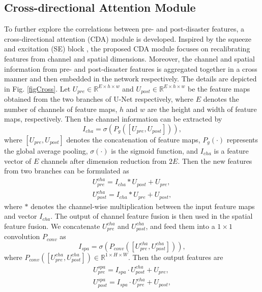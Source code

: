 \documentclass[journal]{IEEEtran}
\begin{document}
\subsection{Cross-directional Attention Module} 
To further explore the correlations between pre- and post-disaster features, a cross-directional attention (CDA) module is developed. Inspired by the squeeze and excitation (SE) block \cite{royRecalibratingFullyConvolutional2019}, the proposed CDA module focuses on recalibrating features from channel and spatial dimensions. 
Moreover, the channel and spatial information from  pre- and post-disaster features is aggregated together in a cross manner and then embedded in the network respectively. The details are depicted in Fig. \ref{figCross}. Let $U_{pre} \in\mathbb{R}^{E\times h\times w}$ and $U_{post}\in\mathbb{R}^{E\times h\times w}$ be the feature maps obtained from the two branches of U-Net respectively, where $E$ denotes the number of channels of feature maps, $h$ and $w$ are the height and width of feature maps, respectively. Then the channel information can be extracted by
\begin{equation}
I_{cha} = \sigma(P_g([U_{pre}, U_{post}])), 
\label{eqAverageP}
\end{equation}
where $[U_{pre}, U_{post}]$ denotes the concatenation of feature maps, $P_g(\cdot)$ represents the global average pooling,  $\sigma(\cdot)$ is the sigmoid function, and $I_{cha}$
is a feature vector of $E$ channels after dimension reduction from $2E$. Then the new features from two branches can be formulated as
\begin{equation}
\begin{aligned}
U_{pre}^{cha} = I_{cha}\ast U_{post} + U_{pre}, \\
U_{post}^{cha} = I_{cha}\ast U_{pre} + U_{post},
\end{aligned}
\label{eqChannel}
\end{equation}
where $\ast$ denotes the channel-wise multiplication between the input feature maps and vector $I_{cha}$. The output of channel feature fusion is then used in the spatial feature fusion. We concatenate $U_{pre}^{cha}$ and $U_{post}^{cha}$, and feed them into a $1\times1$ convolution $P_{conv}$ as
\begin{equation}
I_{spa} = \sigma(P_{conv}([U_{pre}^{cha}, U_{post}^{cha}])), 
\label{eqConv1}
\end{equation}
where $P_{conv}([U_{pre}^{cha}, U_{post}^{cha}]) \in \mathbb{R}^{1\times H \times W}$.
Then the output features are 
\begin{equation}
\begin{aligned}
U_{pre}^{spa} = I_{spa}\cdot U_{post}^{cha} + U_{pre}, \\
U_{post}^{spa} = I_{spa}\cdot U_{pre}^{cha} + U_{post},
\end{aligned}
\end{equation}
\end{document}
